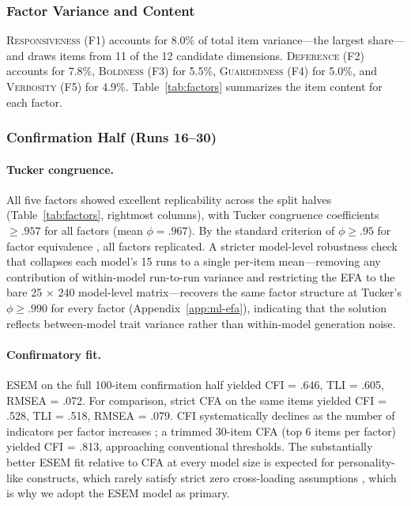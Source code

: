 \documentclass[11pt]{article}
\newcommand{\factorname}[1]{\textsc{#1}}
\begin{document}
\subsubsection{Factor Variance and Content}

\factorname{Responsiveness} (F1) accounts for 8.0\% of total item variance---the largest share---and draws items from 11 of the 12 candidate dimensions.
\factorname{Deference} (F2) accounts for 7.8\%, \factorname{Boldness} (F3) for 5.5\%, \factorname{Guardedness} (F4) for 5.0\%, and \factorname{Verbosity} (F5) for 4.9\%.
Table~\ref{tab:factors} summarizes the item content for each factor.

\subsubsection{Confirmation Half (Runs 16--30)}

\paragraph{Tucker congruence.}
All five factors showed excellent replicability across the split halves (Table~\ref{tab:factors}, rightmost columns), with Tucker congruence coefficients $\geq .957$ for all factors (mean $\phi = .967$).
By the standard criterion of $\phi \geq .95$ for factor equivalence \citep{lorenzo2006tuckers}, all factors replicated.
A stricter model-level robustness check that collapses each model's 15 runs to a single per-item mean---removing any contribution of within-model run-to-run variance and restricting the EFA to the bare 25 $\times$ 240 model-level matrix---recovers the same factor structure at Tucker's $\phi \geq .990$ for every factor (Appendix~\ref{app:ml-efa}), indicating that the solution reflects between-model trait variance rather than within-model generation noise.

\paragraph{Confirmatory fit.}
ESEM on the full 100-item confirmation half yielded CFI = .646, TLI = .605, RMSEA = .072.
For comparison, strict CFA on the same items yielded CFI = .528, TLI = .518, RMSEA = .079.
CFI systematically declines as the number of indicators per factor increases \citep{marsh2014exploratory}; a trimmed 30-item CFA (top 6 items per factor) yielded CFI = .813, approaching conventional thresholds.
The substantially better ESEM fit relative to CFA at every model size is expected for personality-like constructs, which rarely satisfy strict zero cross-loading assumptions \citep{marsh2014exploratory}, which is why we adopt the ESEM model as primary.
\end{document}
